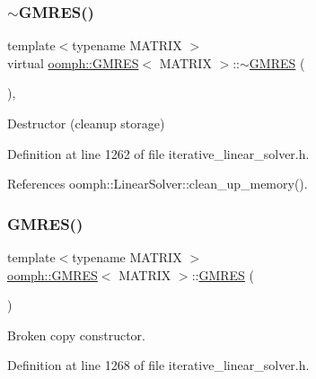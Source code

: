 \subsubsection{\texorpdfstring{$\sim$\+G\+M\+R\+E\+S()}{~GMRES()}}
{\footnotesize\ttfamily template$<$typename M\+A\+T\+R\+IX $>$ \\
virtual \hyperlink{classoomph_1_1GMRES}{oomph\+::\+G\+M\+R\+ES}$<$ M\+A\+T\+R\+IX $>$\+::$\sim$\hyperlink{classoomph_1_1GMRES}{G\+M\+R\+ES} (\begin{DoxyParamCaption}{ }\end{DoxyParamCaption})\hspace{0.3cm}{\ttfamily [inline]}, {\ttfamily [virtual]}}



Destructor (cleanup storage) 



Definition at line 1262 of file iterative\+\_\+linear\+\_\+solver.\+h.



References oomph\+::\+Linear\+Solver\+::clean\+\_\+up\+\_\+memory().

\mbox{\label{classoomph_1_1GMRES_a30aad2a03ce6a42afb9a73628518fdab}} 
\subsubsection{\texorpdfstring{G\+M\+R\+E\+S()}{GMRES()}\hspace{0.1cm}{\footnotesize\ttfamily [2/2]}}
{\footnotesize\ttfamily template$<$typename M\+A\+T\+R\+IX $>$ \\
\hyperlink{classoomph_1_1GMRES}{oomph\+::\+G\+M\+R\+ES}$<$ M\+A\+T\+R\+IX $>$\+::\hyperlink{classoomph_1_1GMRES}{G\+M\+R\+ES} (\begin{DoxyParamCaption}\item[{const \hyperlink{classoomph_1_1GMRES}{G\+M\+R\+ES}$<$ M\+A\+T\+R\+IX $>$ \&}]{ }\end{DoxyParamCaption})\hspace{0.3cm}{\ttfamily [inline]}}



Broken copy constructor. 



Definition at line 1268 of file iterative\+\_\+linear\+\_\+solver.\+h.



